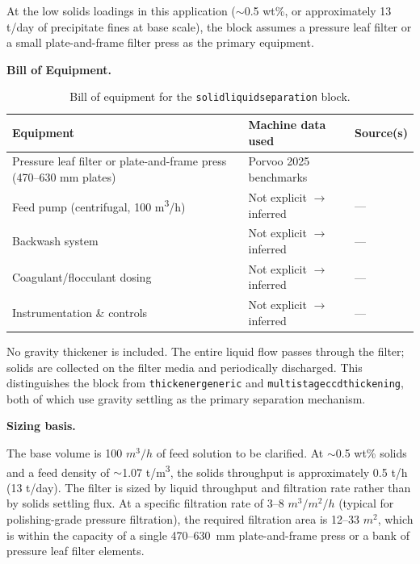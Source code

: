 \documentclass{article}
\renewcommand\_{\textunderscore\allowbreak}
\begin{document}
At the low solids loadings in this application ($\sim$0.5 wt\%, or approximately 13 t/day of precipitate fines at base scale), the block assumes a pressure leaf filter or a small plate-and-frame filter press as the primary equipment.

\medskip
\noindent\textbf{Bill of Equipment.}\quad

\begin{table}[h!]
\caption{Bill of equipment for the \texttt{solid\_liquid\_separation} block.}
\centering
\begin{tabular}{>{\raggedright\arraybackslash}p{5.2cm}
				>{\raggedright\arraybackslash}p{4cm}
				>{\raggedright\arraybackslash}p{4.5cm}}
\toprule
\textbf{Equipment} & \textbf{Machine data used} & \textbf{Source(s)} \\
\midrule
Pressure leaf filter or plate-and-frame press (470--630 mm plates) & Porvoo 2025 benchmarks & \citet{porvooIndustrialFilterPress2025} \\
Feed pump (centrifugal, 100 \si{m^3/h}) & Not explicit $\rightarrow$ inferred & --- \\
Backwash system & Not explicit $\rightarrow$ inferred & --- \\
Coagulant/flocculant dosing & Not explicit $\rightarrow$ inferred & --- \\
Instrumentation \& controls & Not explicit $\rightarrow$ inferred & --- \\
\bottomrule
\end{tabular}
\end{table}

\noindent No gravity thickener is included. The entire liquid flow passes through the filter; solids are collected on the filter media and periodically discharged. This distinguishes the block from \texttt{thickener\_generic} and \texttt{multi\_stage\_ccd\_thickening}, both of which use gravity settling as the primary separation mechanism.


\medskip
\noindent\textbf{Sizing basis.}\quad

The base volume is 100 $\si{m^3/h}$ of feed solution to be clarified. At $\sim$0.5 wt\% solids and a feed density of $\sim$1.07 \si{t/m^3}, the solids throughput is approximately 0.5 t/h (13 t/day). The filter is sized by liquid throughput and filtration rate rather than by solids settling flux. At a specific filtration rate of 3--8 $\si{m^3/m^2/h}$ (typical for polishing-grade pressure filtration), the required filtration area is 12--33 $\si{m^2}$, which is within the capacity of a single 470--630~mm plate-and-frame press or a bank of pressure leaf filter elements.
\end{document}
